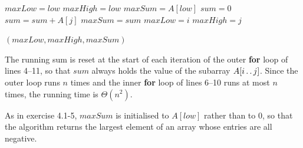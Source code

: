 \begin{algorithmic}[1]
  \STATE $\mathit{maxLow} = \mathit{low}$
  \STATE $\mathit{maxHigh} = \mathit{low}$
  \STATE $\mathit{maxSum} = A[\mathit{low}]$
  \STATE $\mathit{sum} = 0$
  \STATE $\mathit{sum} = \mathit{sum} + A[j]$
  \STATE $\mathit{maxSum} = \mathit{sum}$
  \STATE $\mathit{maxLow} = i$
  \STATE $\mathit{maxHigh} = j$
  \ENDIF
  \ENDFOR
  \ENDFOR

  \RETURN $(\mathit{maxLow}, \mathit{maxHigh}, \mathit{maxSum})$
\end{algorithmic}

The running sum is reset at the start of each iteration of the outer
\textbf{for} loop of lines 4--11, so that $\mathit{sum}$ always holds the value
of the subarray $A[i \mathinner{{\ldotp}\,{\ldotp}} j]$. Since the outer loop runs $n$ times and the
inner \textbf{for} loop of lines 6--10 runs at most $n$ times, the running time
is $\Theta(n^2)$.

As in exercise 4.1-5, $\mathit{maxSum}$ is initialised to $A[\mathit{low}]$
rather than to 0, so that the algorithm returns the largest element of an array
whose entries are all negative.
